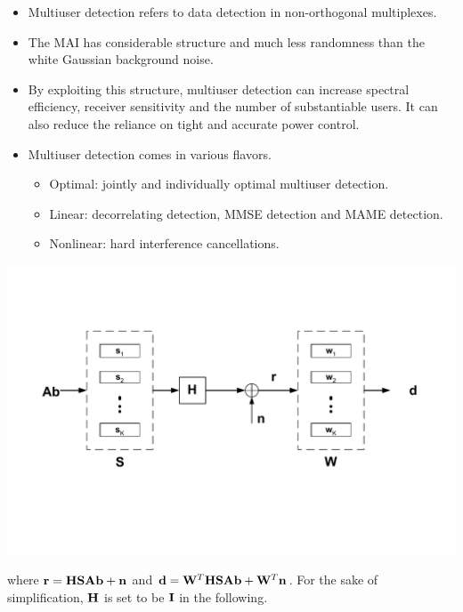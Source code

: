 \documentclass[20pt,landscape]{foils}
\newcommand{\br}{{\mathbf r}}
\newcommand{\bA}{{\mathbf A}}
\newcommand{\bb}{{\bf b}}
\newcommand{\bd}{{\bf d}}
\newcommand{\bn}{{\bf n}}
\newcommand{\bH}{{\bf H}}
\newcommand{\bS}{{\bf S}}
\newcommand{\bI}{{\bf I}}
\newcommand{\bW}{{\bf W}}
\begin{document}
\begin{itemize}
\item Multiuser detection refers to data detection in
non-orthogonal multiplexes.

\item The MAI has considerable structure and much less randomness
than the white Gaussian background noise.

\item By exploiting this structure, multiuser detection can
increase spectral efficiency, receiver sensitivity and the number
of substantiable users. It can also reduce the reliance on tight
and accurate power control.

\item Multiuser detection comes in various flavors.

    \begin{itemize}
    \item Optimal: jointly and individually optimal multiuser
    detection.
    \item Linear: decorrelating detection, MMSE detection and MAME detection.
    \item Nonlinear: hard interference cancellations.
    \end{itemize}

\end{itemize}

\begin{center}
\vspace{-0.5in}\includegraphics[width=7in]{MIMO_channel.pdf}
\end{center}
where $\br=\bH\bS\bA\bb+\bn$ and $\bd=\bW^T\bH\bS\bA\bb+\bW^T\bn$.
For the sake of simplification, $\bH$ is set to be $\bI$ in the
following.
\end{document}
